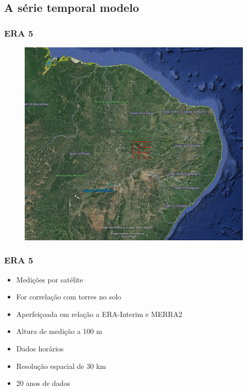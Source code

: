 \documentclass[mathserif,serif]{beamer}
\begin{document}
\subsection{A série temporal modelo}

\begin{frame}
	\frametitle{ERA 5}
	\begin{figure}
		\centering
		\includegraphics[scale=0.9]{era5nodes}
	\end{figure}
\end{frame}

\begin{frame}
	\frametitle{ERA 5}
	\begin{itemize}
		\item<1-> Medições por satélite
		\item<2-> For correlação com torres no solo
		\item<3-> Aperfeiçoada em relação a ERA-Interim e MERRA2
		\item<4-> Altura de medição a 100 m
		\item<5-> Dados horários
		\item<6-> Resolução espacial de 30 km
		\item<7-> 20 anos de dados
	\end{itemize}
\end{frame}
\end{document}
